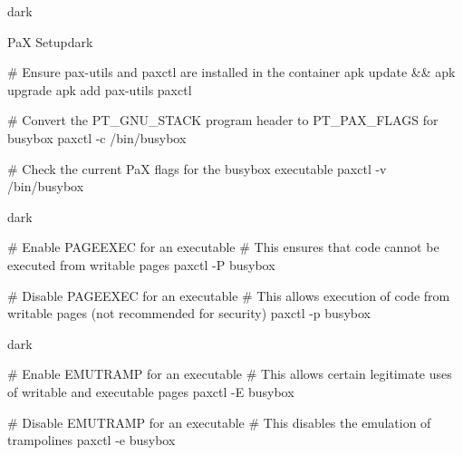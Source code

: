 \begin{baseBoxThree}{}{dark}
    \smallskip
    \begin{baseBoxThree}{PaX Setup}{dark}
        \begin{posnex}
# Ensure pax-utils and paxctl are installed in the container
apk update && apk upgrade
apk add pax-utils paxctl

# Convert the PT_GNU_STACK program header to PT_PAX_FLAGS for busybox
paxctl -c /bin/busybox

# Check the current PaX flags for the busybox executable
paxctl -v /bin/busybox
        \end{posnex}
    \end{baseBoxThree}
    \smallskip
    \label{PAGEEXEC}
    \begin{baseBoxThree}{}{dark}
        \begin{posnex}
# Enable PAGEEXEC for an executable
# This ensures that code cannot be executed from writable pages
paxctl -P busybox

# Disable PAGEEXEC for an executable
# This allows execution of code from writable pages (not recommended for security)
paxctl -p busybox
        \end{posnex}
    \end{baseBoxThree}
    \smallskip
    \label{EMUTRAMP}
    \begin{baseBoxThree}{}{dark}
        \begin{posnex}
# Enable EMUTRAMP for an executable
# This allows certain legitimate uses of writable and executable pages
paxctl -E busybox

# Disable EMUTRAMP for an executable
# This disables the emulation of trampolines
paxctl -e busybox
        \end{posnex}
    \end{baseBoxThree}
    \smallskip
\end{baseBoxThree}

